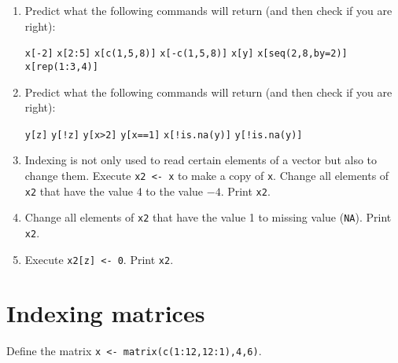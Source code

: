 \documentclass{article}
\begin{document}
\begin{enumerate}
\item Predict what the following commands will return (and then check if you
are right):

\texttt{x[-2]}\newline
\texttt{x[2:5]}\newline
\texttt{x[c(1,5,8)]}\newline
\texttt{x[-c(1,5,8)]}\newline
\texttt{x[y]}\newline
\texttt{x[seq(2,8,by=2)]}\newline
\texttt{x[rep(1:3,4)]}

\item Predict what the following commands will return (and then check if you
are right):

\texttt{y[z]}\newline
\texttt{y[!z]}\newline
\texttt{y[x>2]}\newline
\texttt{y[x==1]}\newline
\texttt{x[!is.na(y)]}\newline
\texttt{y[!is.na(y)]}

\item Indexing is not only used to read certain elements of a vector but
also to change them. Execute \texttt{x2 <- x} to make a copy of 
\texttt{x}. Change all elements of \texttt{x2} that have the value 4 to the
value $-4$. Print \texttt{x2}.

\item Change all elements of \texttt{x2} that have the value 1 to missing
value (\texttt{NA}). Print \texttt{x2}.

\item Execute \texttt{x2[z] <- 0}. Print \texttt{x2}.
\end{enumerate}
\newpage


\section{Indexing matrices}

Define the matrix \texttt{x <- matrix(c(1:12,12:1),4,6)}.
\end{document}

